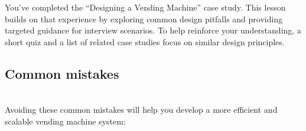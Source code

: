 

You've completed the ``Designing a Vending Machine'' case study. This lesson builds on that experience by exploring common design pitfalls and providing targeted guidance for interview scenarios. To help reinforce your understanding, a short quiz and a list of related case studies focus on similar design principles.

\subsection{Common mistakes}\label{1kdgA-wUpsiGNTt4RZ6oJ}
\\
Avoiding these common mistakes will help you develop a more efficient and scalable vending machine system:

